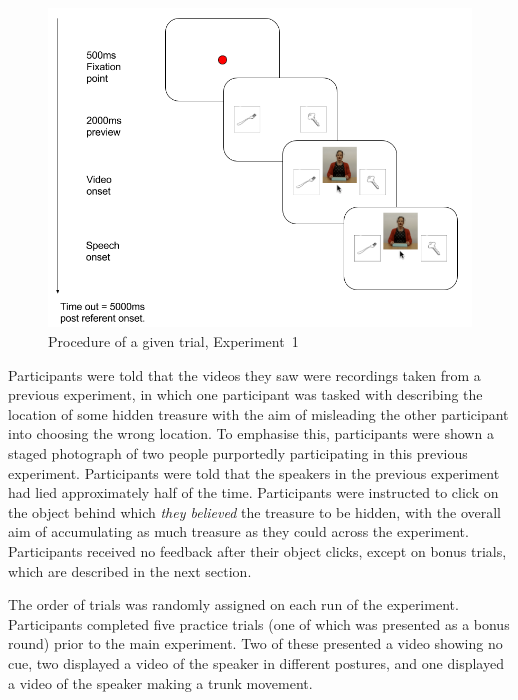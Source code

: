 \documentclass[a4paper,man,natbib]{apa6}
\begin{document}
\begin{figure}[Ht]
  \centering
	\includegraphics[width=\linewidth]{./img/e7_trial.png}
  \caption{Procedure of a given trial, Experiment~1}
  \label{fig:v1_trial}
\end{figure}

Participants were told that the videos they saw were recordings taken from a previous experiment, in which one participant was tasked with describing the location of some hidden treasure with the aim of misleading the other participant into choosing the wrong location.
To emphasise this, participants were shown a staged photograph of two people purportedly participating in this previous experiment. 
Participants were told that the speakers in the previous experiment had lied approximately half of the time. 
Participants were instructed to click on the object behind which \textit{they believed} the treasure to be hidden, with the overall aim of accumulating as much treasure as they could across the experiment.
Participants received no feedback after their object clicks, except on bonus trials, which are described in the next section.

The order of trials was randomly assigned on each run of the experiment.
Participants completed five practice trials (one of which was presented as a bonus round) prior to the main experiment. 
Two of these presented a video showing no cue, two displayed a video of the speaker in different postures, and one displayed a video of the speaker making a trunk movement.
\end{document}
